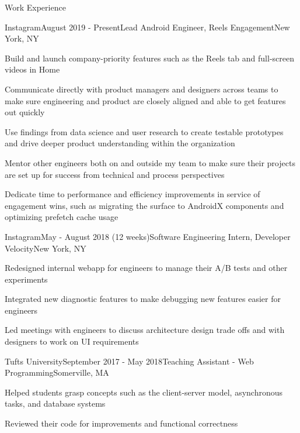 \documentclass{resume}
\begin{document}
  \begin{rSection}{Work Experience}

    \begin{rSubsection}{Instagram}{August 2019 - Present}{Lead Android Engineer, Reels Engagement}{New York, NY}
      \item Build and launch company-priority features such as the Reels tab and full-screen videos in Home
      \item Communicate directly with product managers and designers across teams to make sure engineering and product are closely aligned and able to get features out quickly
      \item Use findings from data science and user research to create testable prototypes and drive deeper product understanding within the organization 
      \item Mentor other engineers both on and outside my team to make sure their projects are set up for success from technical and process perspectives
      \item Dedicate time to performance and efficiency improvements in service of engagement wins, such as migrating the surface to AndroidX components and optimizing prefetch cache usage
    \end{rSubsection}

    \begin{rSubsection}{Instagram}{May - August 2018 (12 weeks)}{Software Engineering Intern, Developer Velocity}{New York, NY}
      \item Redesigned internal webapp for engineers to manage their A/B tests and other experiments
      \item Integrated new diagnostic features to make debugging new features easier for engineers
      \item Led meetings with engineers to discuss architecture design trade offs and with designers to work on UI requirements
    \end{rSubsection}

    \begin{rSubsection}{Tufts University}{September 2017 - May 2018}{Teaching Assistant - Web Programming}{Somerville, MA}
      \item Helped students grasp concepts such as the client-server model, asynchronous tasks, and database systems
      \item Reviewed their code for improvements and functional correctness
    \end{rSubsection}


\end{rSection}
\end{document}
